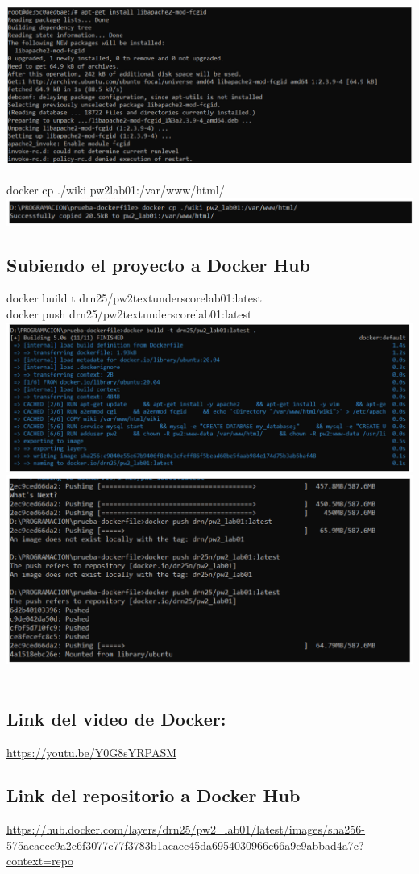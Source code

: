 \documentclass{article}
\begin{document}
\includegraphics[width=\textwidth]{img/c10.png}
\\
\\
docker cp ./wiki pw2lab01:/var/www/html/\\
\includegraphics[width=\textwidth]{img/c11.png}


\subsection{Subiendo el proyecto a Docker Hub}

docker build t drn25/pw2textunderscorelab01:latest\\
docker push drn25/pw2textunderscorelab01:latest\\
\includegraphics[width=\textwidth]{img/c12.png}\\\includegraphics[width=\textwidth]{img/c13.png}
\\
\\

\subsection{Link del video de Docker:}
\url{https://youtu.be/Y0G8sYRPASM}

\subsection{Link del repositorio a Docker Hub}
\url{https://hub.docker.com/layers/drn25/pw2_lab01/latest/images/sha256-575aeaece9a2c6f3077c77f3783b1acacc45da6954030966c66a9c9abbad4a7c?context=repo}
\end{document}
